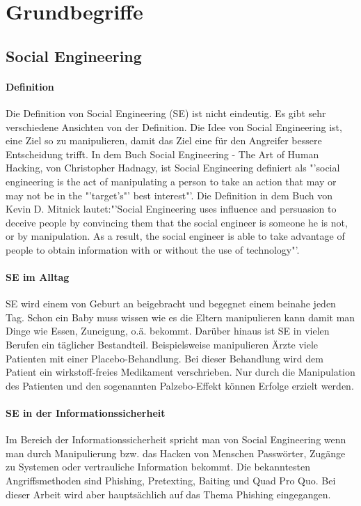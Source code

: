 
\chapter {Grundbegriffe}  %
\label{cha:grundlagen} %

\section{Social Engineering} %
\label {sec:Unterkapitel} %
\subsubsection{Definition}
Die Definition von Social Engineering (SE) ist nicht eindeutig. Es gibt sehr verschiedene Ansichten von der Definition. Die Idee von Social Engineering ist, eine Ziel so zu manipulieren, damit das Ziel eine für den Angreifer bessere Entscheidung trifft. In dem Buch Social Engineering - The Art of Human Hacking, von Christopher Hadnagy, ist Social Engineering definiert als "'social engineering is the act of manipulating a person to take an action that may or may not be in the "'target’s"' best interest"'\cite{ArtOfHumanHacking}. Die Definition in dem Buch von Kevin D. Mitnick lautet:"'Social Engineering uses influence and persuasion to deceive people by convincing them that the social engineer is someone he is not, or by manipulation. As a result, the social engineer is able to take advantage of people to obtain information with or without the use of technology"'\cite{ArtOfDeception}.\\

\subsubsection{SE im Alltag}
SE wird einem von Geburt an beigebracht und begegnet einem beinahe jeden Tag. Schon ein Baby muss wissen wie es die Eltern manipulieren kann damit man Dinge wie Essen, Zuneigung, o.ä. bekommt. Darüber hinaus ist SE in vielen Berufen ein täglicher Bestandteil. Beispielsweise manipulieren Ärzte viele Patienten mit einer Placebo-Behandlung. Bei dieser Behandlung wird dem Patient ein wirkstoff-freies Medikament verschrieben. Nur durch die Manipulation des Patienten und den sogenannten Palzebo-Effekt können Erfolge erzielt werden.\\

\subsubsection{SE in der Informationssicherheit}
Im Bereich der Informationssicherheit spricht man von Social Engineering wenn man durch Manipulierung bzw. das Hacken von Menschen Passwörter, Zugänge zu Systemen oder vertrauliche Information bekommt. Die bekanntesten Angriffsmethoden sind Phishing, Pretexting, Baiting und Quad Pro Quo. Bei dieser Arbeit wird aber hauptsächlich auf das Thema Phishing eingegangen.

